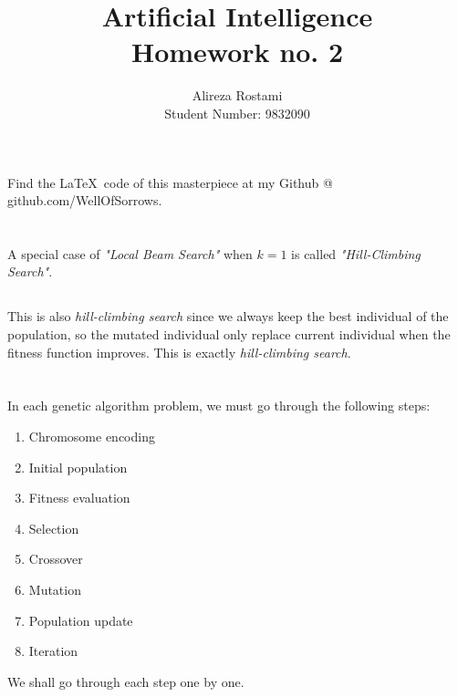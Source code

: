 \documentclass{article}
\title{Artificial Intelligence\\Homework no. 2}
\author{Alireza Rostami\\Student Number: 9832090}
\date{}
\begin{document}
    \maketitle
    \begin{center}
        Find the \LaTeX \ code of this masterpiece at my Github @ github.com/WellOfSorrows.
    \end{center}
    \section{}
    \subsection{}
    \qquad A special case of \textit{"Local Beam Search"} when $ k= 1 $ is called  \textit{"Hill-Climbing Search"}.
    \smallskip
    \subsection{}
    \qquad This is also \textit{hill-climbing search} since we always keep the best individual of the population, so the mutated individual only replace current individual when the fitness function improves. This is exactly  \textit{hill-climbing search}.
    \bigskip
    \section{}
    In each genetic algorithm problem, we must go through the following steps:
    \begin{enumerate}
        \item Chromosome encoding
        \item Initial population
        \item Fitness evaluation
        \item Selection
        \item Crossover
        \item Mutation
        \item Population update
        \item Iteration
    \end{enumerate}
    \medskip
    We shall go through each step one by one.
    \pagebreak
\end{document}
